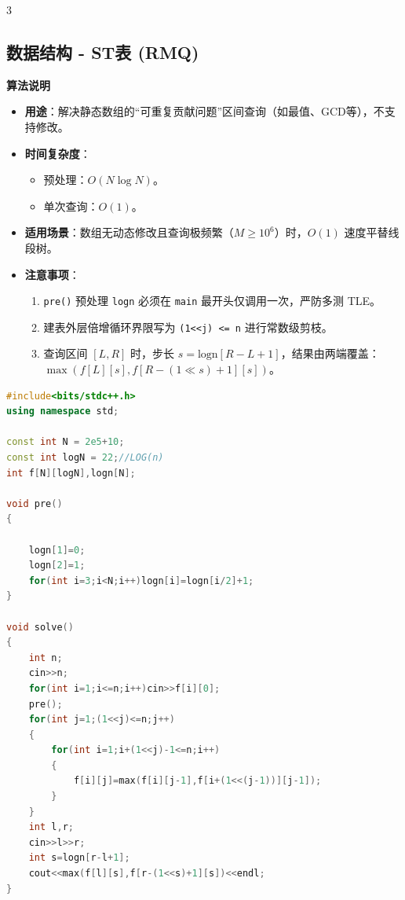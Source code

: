 \documentclass[10pt,landscape,a4paper]{article}
\begin{document}
\begin{multicols*}{3}
\subsection*{数据结构 - ST表 (RMQ)}
\par\addvspace{0.7ex}\noindent\textbf{算法说明}\par\nobreak
\begin{itemize}
\item \textbf{用途}：解决静态数组的“可重复贡献问题”区间查询（如最值、GCD等），不支持修改。
\item \textbf{时间复杂度}：
\begin{itemize}
\item 预处理：$O(N \log N)$。
\item 单次查询：$O(1)$。
\end{itemize}
\item \textbf{适用场景}：数组无动态修改且查询极频繁（$M \ge 10^6$）时，$O(1)$ 速度平替线段树。
\item \textbf{注意事项}：
\begin{enumerate}[start=1]
\item \texttt{p\allowbreak{}r\allowbreak{}e\allowbreak{}(\allowbreak{})} 预处理 \texttt{l\allowbreak{}o\allowbreak{}g\allowbreak{}n} 必须在 \texttt{m\allowbreak{}a\allowbreak{}i\allowbreak{}n} 最开头仅调用一次，严防多测 TLE。
\item 建表外层倍增循环界限写为 \texttt{(\allowbreak{}1\allowbreak{}\textless{}\allowbreak{}\textless{}\allowbreak{}j\allowbreak{})\allowbreak{} \allowbreak{}\textless{}\allowbreak{}=\allowbreak{} \allowbreak{}n} 进行常数级剪枝。
\item 查询区间 $[L, R]$ 时，步长 $s = \text{logn}[R - L + 1]$，结果由两端覆盖：$\max(f[L][s], f[R - (1 \ll s) + 1][s])$。
\end{enumerate}
\end{itemize}
\par{}\par
\begin{lstlisting}[language=C++]
#include<bits/stdc++.h>
using namespace std;

const int N = 2e5+10;
const int logN = 22;//LOG(n)
int f[N][logN],logn[N];

void pre()
{

    logn[1]=0;
    logn[2]=1;
    for(int i=3;i<N;i++)logn[i]=logn[i/2]+1;
}

void solve()
{
    int n;
    cin>>n;
    for(int i=1;i<=n;i++)cin>>f[i][0];
    pre();
    for(int j=1;(1<<j)<=n;j++)
    {
        for(int i=1;i+(1<<j)-1<=n;i++)
        {
            f[i][j]=max(f[i][j-1],f[i+(1<<(j-1))][j-1]);
        }
    }
    int l,r;
    cin>>l>>r;
    int s=logn[r-l+1];
    cout<<max(f[l][s],f[r-(1<<s)+1][s])<<endl;
}
\end{lstlisting}

\end{multicols*}
\end{document}
